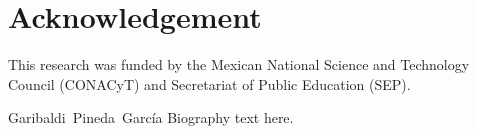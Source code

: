 \documentclass[conference]{IEEEtran}
\begin{document}
\section*{Acknowledgement}

This research was funded by the Mexican National Science and Technology Council (CONACyT) and Secretariat of Public Education (SEP).






\begin{IEEEbiography}{Garibaldi~Pineda~García}
  Biography text here.
\end{IEEEbiography}
\end{document}
